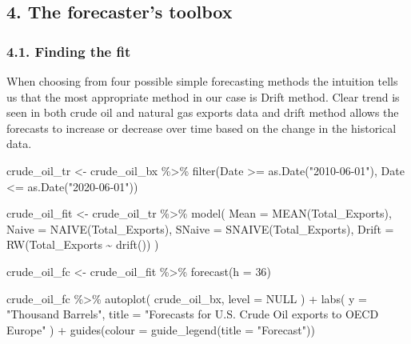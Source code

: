 \documentclass[
]{article}
\newenvironment{Shaded}{\begin{snugshade}}{\end{snugshade}}
\newcommand{\AttributeTok}[1]{\textcolor[rgb]{0.77,0.63,0.00}{#1}}
\newcommand{\ConstantTok}[1]{\textcolor[rgb]{0.00,0.00,0.00}{#1}}
\newcommand{\DecValTok}[1]{\textcolor[rgb]{0.00,0.00,0.81}{#1}}
\newcommand{\FunctionTok}[1]{\textcolor[rgb]{0.00,0.00,0.00}{#1}}
\newcommand{\NormalTok}[1]{#1}
\newcommand{\OtherTok}[1]{\textcolor[rgb]{0.56,0.35,0.01}{#1}}
\newcommand{\SpecialCharTok}[1]{\textcolor[rgb]{0.00,0.00,0.00}{#1}}
\newcommand{\StringTok}[1]{\textcolor[rgb]{0.31,0.60,0.02}{#1}}
\begin{document}
\hypertarget{the-forecasters-toolbox}{%
\subsection{4. The forecaster's toolbox}\label{the-forecasters-toolbox}}

\hypertarget{finding-the-fit}{%
\subsubsection{4.1. Finding the fit}\label{finding-the-fit}}

When choosing from four possible simple forecasting methods the
intuition tells us that the most appropriate method in our case is Drift
method. Clear trend is seen in both crude oil and natural gas exports
data and drift method allows the forecasts to increase or decrease over
time based on the change in the historical data.

\begin{Shaded}
\begin{Highlighting}[]
\NormalTok{crude\_oil\_tr }\OtherTok{\textless{}{-}}\NormalTok{ crude\_oil\_bx }\SpecialCharTok{\%\textgreater{}\%} 
  \FunctionTok{filter}\NormalTok{(Date }\SpecialCharTok{\textgreater{}=} \FunctionTok{as.Date}\NormalTok{(}\StringTok{"2010{-}06{-}01"}\NormalTok{), Date }\SpecialCharTok{\textless{}=} \FunctionTok{as.Date}\NormalTok{(}\StringTok{"2020{-}06{-}01"}\NormalTok{))}

\NormalTok{crude\_oil\_fit }\OtherTok{\textless{}{-}}\NormalTok{ crude\_oil\_tr }\SpecialCharTok{\%\textgreater{}\%} 
  \FunctionTok{model}\NormalTok{(}
    \AttributeTok{Mean =} \FunctionTok{MEAN}\NormalTok{(Total\_Exports),}
    \AttributeTok{Naive =} \FunctionTok{NAIVE}\NormalTok{(Total\_Exports),}
    \AttributeTok{SNaive =} \FunctionTok{SNAIVE}\NormalTok{(Total\_Exports),}
    \AttributeTok{Drift =} \FunctionTok{RW}\NormalTok{(Total\_Exports }\SpecialCharTok{\textasciitilde{}} \FunctionTok{drift}\NormalTok{())}
\NormalTok{  )}

\NormalTok{crude\_oil\_fc }\OtherTok{\textless{}{-}}\NormalTok{ crude\_oil\_fit }\SpecialCharTok{\%\textgreater{}\%} 
  \FunctionTok{forecast}\NormalTok{(}\AttributeTok{h =} \DecValTok{36}\NormalTok{)}

\NormalTok{crude\_oil\_fc }\SpecialCharTok{\%\textgreater{}\%} 
  \FunctionTok{autoplot}\NormalTok{(}
\NormalTok{    crude\_oil\_bx,}
    \AttributeTok{level =} \ConstantTok{NULL}
\NormalTok{  ) }\SpecialCharTok{+}
  \FunctionTok{labs}\NormalTok{(}
    \AttributeTok{y =} \StringTok{"Thousand Barrels"}\NormalTok{,}
    \AttributeTok{title =} \StringTok{"Forecasts for U.S. Crude Oil exports to OECD Europe"}
\NormalTok{  ) }\SpecialCharTok{+}
  \FunctionTok{guides}\NormalTok{(}\AttributeTok{colour =} \FunctionTok{guide\_legend}\NormalTok{(}\AttributeTok{title =} \StringTok{"Forecast"}\NormalTok{))}
\end{Highlighting}
\end{Shaded}
\end{document}
